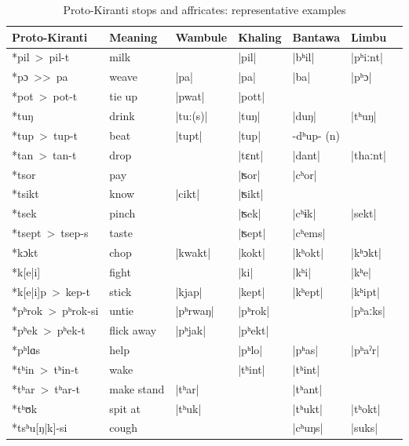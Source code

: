 \documentclass[oneside,a4paper,11pt]{article}
\newcommand{\ipa}[1]{{\phon\mbox{#1}}} %
\newcommand{\dhat}[1]{|\ipa{#1}|}
\begin{document}
\begin{table}
\caption{Proto-Kiranti stops and affricates: representative examples} \centering \label{tab:stops.ex}
\begin{tabular}{lllllll}
\toprule
Proto-Kiranti & Meaning & Wambule & Khaling & Bantawa & Limbu\\
\midrule
\ipa{*pil > pil-t} &	milk &	&	\dhat{pil} &	\dhat{bʰil} &	\dhat{pʰiːnt} &	\\
\ipa{*pɔ >{}> pa} &	weave &	\dhat{pa} &	\dhat{pa} &	\dhat{ba} &	\dhat{pʰɔ} &	\\
\ipa{*pot > pot-t} &	tie up &	\dhat{pwat} &	\dhat{pott} &	&	&	\\
\midrule			
\ipa{*tuŋ} &	drink &	\dhat{tu:(s)} &	\dhat{tuŋ} &	\dhat{duŋ} &	\dhat{tʰuŋ} &	\\
\ipa{*tup > tup-t} &	beat &	\dhat{tupt} &	\dhat{tup} &	\ipa{-dʰup-} (n)&	&	\\
\ipa{*tan > tan-t} &	drop &	&	\dhat{tɛnt} &	\dhat{dant} &	\dhat{thaːnt} &	\\
\midrule				
\ipa{*tsor} &	pay &	&	\dhat{ʦor} &	\dhat{cʰor} &	&	\\
\ipa{*tsikt} &	know &	\dhat{cikt} &	\dhat{ʦikt} &	&	&	\\
\ipa{*tsek} &	pinch &	 &	\dhat{ʦek} &	\dhat{cʰɨk} &	\dhat{sekt} &	\\
\ipa{*tsept > tsep-s} &	taste &	&	\dhat{ʦept} &	\dhat{cʰems} &	&	\\
\midrule
\ipa{*kɔkt} &	chop &	\dhat{kwakt} &	\dhat{kokt} &	\dhat{kʰokt} &	\dhat{kʰɔkt} &	\\
\ipa{*k[e|i]} &	fight &	&	\dhat{ki} &	\dhat{kʰi} &	\dhat{kʰe} &	\\
\ipa{*k[e|i]p > kep-t } &	stick &	\dhat{kjap} &	\dhat{kept} &	\dhat{kʰept} &	\dhat{kʰipt} &	\\
\midrule				
\ipa{*pʰrok > pʰrok-si} &	untie &	\dhat{pʰrwaŋ} &	\dhat{pʰrok} &	&	\dhat{pʰaːks} &	\\
\ipa{*pʰek > pʰek-t} &	flick away &	\dhat{pʰjak} &	\dhat{pʰekt} &	&	 &	\\
\ipa{*pʰlɑs} &	help &	&	\dhat{pʰlo} &	\dhat{pʰas} &	\dhat{pʰaˀr} &	\\
\midrule				
\ipa{*tʰin > tʰin-t} &	wake &	&	\dhat{tʰint} &	\dhat{tʰint} &	&	\\
\ipa{*tʰar > tʰar-t} &	make stand &	\dhat{tʰar} &	&	\dhat{tʰant} &	&	\\
\ipa{*tʰʊk} &	spit at &	\dhat{tʰuk} &	&	\dhat{tʰukt} &	\dhat{tʰokt} &	\\
\midrule		
\ipa{*tsʰu[ŋ|k]-si} &	cough &	&	&	\dhat{cʰuŋs} &	\dhat{suks} &	\\

\end{tabular}
\end{table}
\end{document}
